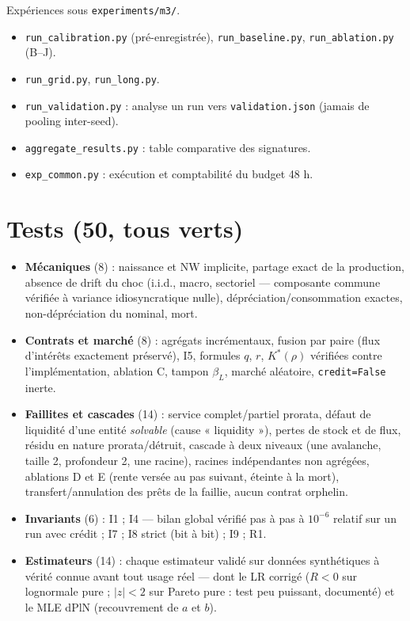 \documentclass[11pt,a4paper]{article}
\newcommand{\NW}{\mathrm{NW}}
\newcommand{\code}[1]{\texttt{#1}}
\begin{document}
Expériences sous \code{experiments/m3/}.
\begin{itemize}[leftmargin=1.5em, itemsep=2pt]
\item \code{run\_calibration.py} (pré-enregistrée), \code{run\_baseline.py},
  \code{run\_ablation.py} (B--J).
\item \code{run\_grid.py}, \code{run\_long.py}.
\item \code{run\_validation.py} : analyse un run vers \code{validation.json}
  (jamais de pooling inter-seed).
\item \code{aggregate\_results.py} : table comparative des signatures.
\item \code{exp\_common.py} : exécution et comptabilité du budget 48 h.
\end{itemize}

\section{Tests (50, tous verts)}

\begin{itemize}[leftmargin=1.5em, itemsep=2pt]
\item \textbf{Mécaniques} (8) : naissance et $\NW$ implicite, partage exact
  de la production, absence de drift du choc (i.i.d., macro, sectoriel —
  composante commune vérifiée à variance idiosyncratique nulle),
  dépréciation/consommation exactes, non-dépréciation du nominal, mort.
\item \textbf{Contrats et marché} (8) : agrégats incrémentaux, fusion par
  paire (flux d'intérêts exactement préservé), I5, formules $q$, $r$,
  $K^*(\rho)$ vérifiées contre l'implémentation, ablation C, tampon
  $\beta_L$, marché aléatoire, \code{credit=False} inerte.
\item \textbf{Faillites et cascades} (14) : service complet/partiel prorata,
  défaut de liquidité d'une entité \emph{solvable} (cause « liquidity »),
  pertes de stock et de flux, résidu en nature prorata/détruit, cascade à
  deux niveaux (une avalanche, taille 2, profondeur 2, une racine), racines
  indépendantes non agrégées, ablations D et E (rente versée au pas suivant,
  éteinte à la mort), transfert/annulation des prêts de la faillie, aucun
  contrat orphelin.
\item \textbf{Invariants} (6) : I1 ; I4 --- bilan global vérifié pas à pas à
  $10^{-6}$ relatif sur un run avec crédit ; I7 ; I8 strict (bit à bit) ;
  I9 ; R1.
\item \textbf{Estimateurs} (14) : chaque estimateur validé sur données
  synthétiques à vérité connue avant tout usage réel --- dont le LR corrigé
  ($R<0$ sur lognormale pure ; $|z|<2$ sur Pareto pure : test peu puissant,
  documenté) et le MLE dPlN (recouvrement de $a$ et $b$).
\end{itemize}
\end{document}
